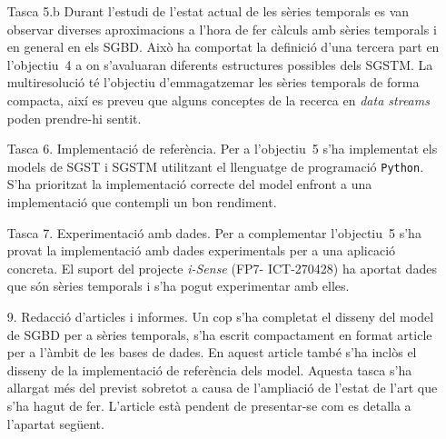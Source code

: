 \begin{enumerate}
\item[Tasca 5.b] Durant l'estudi de l'estat actual de les sèries temporals
  es van observar diverses aproximacions a l'hora de fer càlculs amb
  sèries temporals i en general en els SGBD. Això ha comportat la
  definició d'una tercera part en l'objectiu~4 a on s'avaluaran
  diferents estructures possibles dels SGSTM.  La multiresolució té
  l'objectiu d'emmagatzemar les sèries temporals de forma compacta,
  així es preveu que alguns conceptes de la recerca en \emph{data
    streams} poden prendre-hi sentit.


\item[Tasca 6.] Implementació de referència. Per a l'objectiu~5 s'ha
  implementat els models de SGST i SGSTM utilitzant el llenguatge de
  programació \texttt{Python}. S'ha prioritzat la implementació
  correcte del model enfront a una implementació que contempli un bon
  rendiment. 



\item[Tasca 7.] Experimentació amb dades. Per a complementar
  l'objectiu~5 s'ha provat la implementació amb dades experimentals per
  a una aplicació concreta. El suport del projecte \emph{i-Sense}
  (FP7- ICT-270428) ha aportat dades que són sèries temporals i s'ha
  pogut experimentar amb elles.  





\item[9.] Redacció d'articles i informes. Un cop s'ha completat el
  disseny del model de SGBD per a sèries temporals, s'ha escrit
  compactament en format article per a l'àmbit de les bases de dades.
  En aquest article també s'ha inclòs el disseny de la implementació
  de referència dels model. Aquesta tasca s'ha allargat més del
  previst sobretot a causa de l'ampliació de l'estat de l'art que s'ha
  hagut de fer.  L'article està pendent de presentar-se com es detalla
  a l'apartat següent.  



\end{enumerate}




